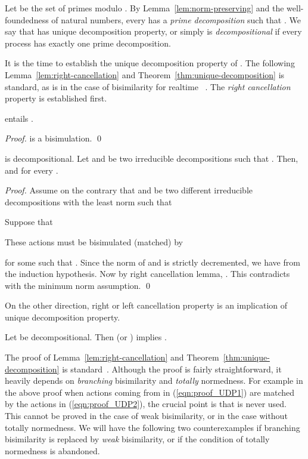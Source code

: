\documentclass{llncs}
\begin{document}
Let  be the set of primes modulo .  By Lemma~\ref{lem:norm-preserving} and the well-foundedness of natural numbers, every  has a {\em prime decomposition}  such that .   We say that  has unique decomposition property, or simply  is {\em decompositional} if every process has exactly one prime decomposition.


It is the time to establish the unique decomposition property of . The following Lemma~\ref{lem:right-cancellation} and Theorem~\ref{thm:unique-decomposition} is standard, as is in the case of bisimilarity for realtime ~\cite{DBLP:journals/tcs/HirshfeldJM96}.
The {\em right cancellation} property is established first.

\begin{lemma}\label{lem:right-cancellation}
 entails .
\end{lemma}

\begin{proof}

is a bisimulation.  \qed
\end{proof}

\begin{theorem}\label{thm:unique-decomposition}  is decompositional.
Let  and   be two irreducible decompositions such that . Then,   and  for every .
\end{theorem}

\begin{proof}
Assume on the contrary that  and   be two different irreducible decompositions with the least norm such that

Suppose that

These actions must be bisimulated (matched) by

for some  such that .
Since the norm of  and  is strictly decremented, we have  from the induction hypothesis.  Now by right cancellation lemma, . This contradicts with the minimum norm assumption.  \qed
\end{proof}
On the other direction,  right or left cancellation property is an implication of unique decomposition property.
\begin{lemma}\label{lemma:udp_to_cancellation}
Let  be decompositional. Then  (or ) implies .
\end{lemma}

\begin{remark}
The proof of Lemma~\ref{lem:right-cancellation} and Theorem~\ref{thm:unique-decomposition} is standard~\cite{BaetenBergstraKlop1987,DBLP:journals/tcs/HirshfeldJM96}.
Although the proof is fairly straightforward, it heavily depends  on {\em branching} bisimilarity and {\em totally} normedness. For example in the above proof when actions coming from  in (\ref{eqn:proof_UDP1}) are matched by the actions in (\ref{eqn:proof_UDP2}),  the crucial point is that  is never used.  This cannot be proved in the case of weak bisimilarity, or in the case without totally normedness.  We will have the following two counterexamples if branching bisimilarity is replaced by {\em weak} bisimilarity, or if the condition of totally normedness is abandoned.
\end{remark}
\end{document}
